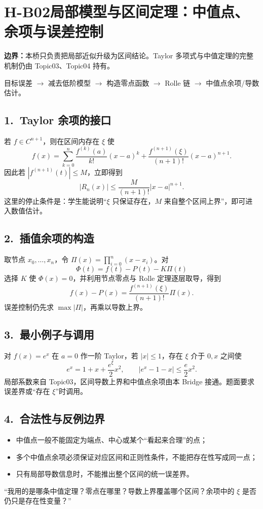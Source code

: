 \documentclass[UTF8,a4paper,10pt]{ctexart}
\begin{document}
\section*{H-B02\quad 局部模型与区间定理：中值点、余项与误差控制}
\textbf{边界：}本桥只负责把局部近似升级为区间结论。Taylor 多项式与中值定理的完整机制仍由 Topic03、Topic04 持有。
\begin{tcolorbox}[title=母接口]
目标误差 $\longrightarrow$ 减去低阶模型 $\longrightarrow$ 构造零点函数
$\longrightarrow$ Rolle 链 $\longrightarrow$ 中值点余项/导数估计。
\end{tcolorbox}
\begin{center}
\end{center}
\subsection*{1.\ Taylor 余项的接口}
若 $f\in C^{n+1}$，则在区间内存在 $\xi$ 使
\[
f(x)=\sum_{k=0}^{n}\frac{f^{(k)}(a)}{k!}(x-a)^k+
\frac{f^{(n+1)}(\xi)}{(n+1)!}(x-a)^{n+1}.
\]
因此若 $|f^{(n+1)}(t)|\le M$，立即得到
\[
|R_n(x)|\le \frac{M}{(n+1)!}|x-a|^{n+1}.
\]
这里的停止条件是：学生能说明“$\xi$ 只保证存在，$M$ 来自整个区间上界”，即可进入数值估计。
\subsection*{2.\ 插值余项的构造}
取节点 $x_0,\ldots,x_n$，令 $\Pi(x)=\prod_{i=0}^{n}(x-x_i)$。对
\[
\Phi(t)=f(t)-P(t)-K\Pi(t)
\]
选择 $K$ 使 $\Phi(x)=0$，并利用节点零点与 Rolle 定理逐层取导，得到
\[
f(x)-P(x)=\frac{f^{(n+1)}(\xi)}{(n+1)!}\Pi(x).
\]
误差控制仍先求 $\max|\Pi|$，再乘以导数上界。
\subsection*{3.\ 最小例子与调用}
对 $f(x)=e^x$ 在 $a=0$ 作一阶 Taylor，若 $|x|\le1$，存在 $\xi$ 介于 $0,x$ 之间使
\[
e^x=1+x+\frac{e^\xi}{2}x^2,\qquad
|e^x-1-x|\le\frac e2x^2.
\]
局部系数来自 Topic03，区间导数上界和中值点余项由本 Bridge 接通。题面要求误差界或“存在 $\xi$”时调用。

\subsection*{4.\ 合法性与反例边界}
\begin{itemize}
\item 中值点一般不能固定为端点、中心或某个“看起来合理”的点；
\item 多个中值点余项必须保证对应区间和正则性条件，不能把存在性写成同一点；
\item 只有局部导数信息时，不能推出整个区间的统一误差界。
\end{itemize}
\begin{tcolorbox}[title=检查句]
“我用的是哪条中值定理？零点在哪里？导数上界覆盖哪个区间？余项中的 $\xi$ 是否仍只是存在性变量？”
\end{tcolorbox}
\end{document}
